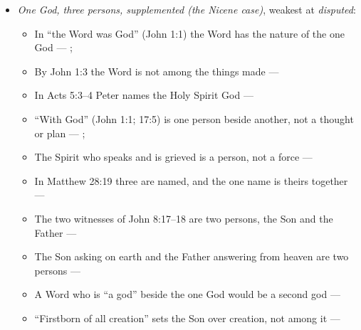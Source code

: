 \documentclass[11pt,paper=\testimonypaper,DIV=13,parskip=false]{scrartcl}
\begin{document}
\begin{itemize}
\begin{itemize}
\item an inference step --- \cite[3, The Triune God]{kibbey-living-systematic-theology-2026}; \cite[ch. 4, Conclusion]{bernard-oneness-of-god-1983}; \cite[17--19]{buzzard-caveat-lector-2001}
\item an inference step --- \cite[ch. 8, Are Jesus and the Father One in Purpose Only?]{bernard-oneness-of-god-1983}; \cite[27]{watchtower-should-you-believe-trinity-1989}; \cite[I, q. 28, a. 3]{aquinas-summa-1920}
\end{itemize}
\item \emph{One God, three persons, supplemented (the Nicene case)}, weakest at \emph{disputed}:
\begin{itemize}
\item In “the Word was God” (John 1:1) the Word has the nature of the one God --- \cite{harner-qualitative-anarthrous-1973}; \cite[3, The Triune God]{kibbey-living-systematic-theology-2026}
\item By John 1:3 the Word is not among the things made --- \cite[Tractates on John I.11]{schaff-nicene-post-nicene-fathers-1-7}
\item In Acts 5:3–4 Peter names the Holy Spirit God --- \cite[198]{calvin-commentary-acts-1844}
\item “With God” (John 1:1; 17:5) is one person beside another, not a thought or plan --- \cite[3, The Triune God]{kibbey-living-systematic-theology-2026}; \cite[27]{watchtower-should-you-believe-trinity-1989}
\item The Spirit who speaks and is grieved is a person, not a force --- \cite[3, The Triune God]{kibbey-living-systematic-theology-2026}
\item In Matthew 28:19 three are named, and the one name is theirs together --- \cite[3, The Triune God]{kibbey-living-systematic-theology-2026}
\item The two witnesses of John 8:17–18 are two persons, the Son and the Father --- \cite[Against Praxeas 22]{roberts-ante-nicene-fathers-3-1885}
\item The Son asking on earth and the Father answering from heaven are two persons --- \cite[Against Praxeas 23]{roberts-ante-nicene-fathers-3-1885}
\item A Word who is “a god” beside the one God would be a second god --- \cite[75]{metzger-jehovahs-witnesses-jesus-christ-1953}
\item “Firstborn of all creation” sets the Son over creation, not among it --- \cite[Against the Arians II.62–63]{schaff-nicene-post-nicene-fathers-2-4-1892}

\end{itemize}
\end{itemize}
\end{document}
